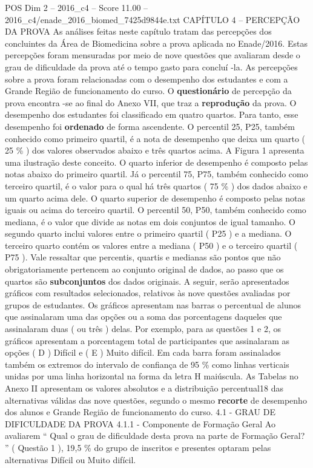 \begin{textsample}{POS Dim 2 – 2016\_c4 – Score 11.00 – 2016\_c4/enade\_2016\_biomed\_7425d9844e.txt}  \label{ex:f2_pos_080}
CAPÍTULO 4 – PERCEPÇÃO DA PROVA As análises feitas neste capítulo tratam das percepções dos concluintes da Área de Biomedicina sobre a prova aplicada no Enade/2016.
Estas percepções foram mensuradas por meio de nove questões que avaliaram desde o grau de dificuldade da prova até o tempo gasto para concluí -la.
As percepções sobre a prova foram relacionadas com o desempenho dos estudantes e com a Grande Região de funcionamento do curso.
O \textbf{questionário} de percepção da prova encontra -se ao final do Anexo VII, que traz a \textbf{reprodução} da prova.
O desempenho dos estudantes foi classificado em quatro quartos.
Para tanto, esse desempenho foi \textbf{ordenado} de forma ascendente.
O percentil 25, P25, também conhecido como primeiro quartil, é a nota de desempenho que deixa um quarto ( 25 \% ) dos valores observados abaixo e três quartos acima.
A Figura 1 apresenta uma ilustração deste conceito.
O quarto inferior de desempenho é composto pelas notas abaixo do primeiro quartil.
Já o percentil 75, P75, também conhecido como terceiro quartil, é o valor para o qual há três quartos ( 75 \% ) dos dados abaixo e um quarto acima dele.
O quarto superior de desempenho é composto pelas notas iguais ou acima do terceiro quartil.
O percentil 50, P50, também conhecido como mediana, é o valor que divide as notas em dois conjuntos de igual tamanho.
O segundo quarto inclui valores entre o primeiro quartil ( P25 ) e a mediana.
O terceiro quarto contém os valores entre a mediana ( P50 ) e o terceiro quartil ( P75 ).
Vale ressaltar que percentis, quartis e medianas são pontos que não obrigatoriamente pertencem ao conjunto original de dados, ao passo que os quartos são \textbf{subconjuntos} dos dados originais.
A seguir, serão apresentados gráficos com resultados selecionados, relativos às nove questões avaliadas por grupos de estudantes.
Os gráficos apresentam nas barras o percentual de alunos que assinalaram uma das opções ou a soma das porcentagens daqueles que assinalaram duas ( ou três ) delas.
Por exemplo, para as questões 1 e 2, os gráficos apresentam a porcentagem total de participantes que assinalaram as opções ( D ) Difícil e ( E ) Muito difícil.
Em cada barra foram assinalados também os extremos do intervalo de confiança de 95 \% como linhas verticais unidas por uma linha horizontal na forma da letra H maiúscula.
As Tabelas no Anexo II apresentam os valores absolutos e a distribuição percentual18 das alternativas válidas das nove questões, segundo o mesmo \textbf{recorte} de desempenho dos alunos e Grande Região de funcionamento do curso. 4.1 - GRAU DE DIFICULDADE DA PROVA 4.1.1 - Componente de Formação Geral Ao avaliarem “ Qual o grau de dificuldade desta prova na parte de Formação Geral? ” ( Questão 1 ), 19,5 \% do grupo de inscritos e presentes optaram pelas alternativas Difícil ou Muito difícil.

\end{textsample}
